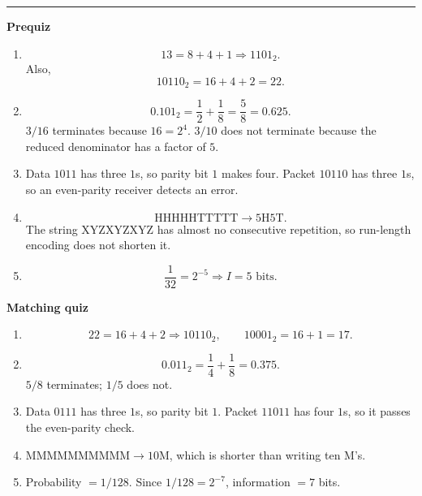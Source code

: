 \documentclass[10pt]{article}
\newcommand{\modulekey}[2]{\clearpage{\Large\bfseries\textcolor{olive}{Module #1: #2 — Answer Key}}\par\textcolor{gold}{\rule{\linewidth}{1.2pt}}\par}
\begin{document}
\modulekey{5}{Basic Computer and Information Theory}
\textbf{Prequiz}
\begin{enumerate}
\item
\[
13=8+4+1\Rightarrow \boxed{1101_2}.
\]
Also,
\[
10110_2=16+4+2=\boxed{22}.
\]
\item
\[
0.101_2=\frac12+\frac18=\frac58=\boxed{0.625}.
\]
\(3/16\) terminates because \(16=2^4\). \(3/10\) does not terminate because the reduced denominator has a factor of \(5\).
\item Data \(1011\) has three \(1\)s, so parity bit \(\boxed1\) makes four. Packet \(10110\) has three \(1\)s, so an even-parity receiver detects an error.
\item
\[
\text{HHHHHTTTTT}\to\boxed{5\text{H}5\text{T}}.
\]
The string XYZXYZXYZ has almost no consecutive repetition, so run-length encoding does not shorten it.
\item
\[
\frac1{32}=2^{-5}\Rightarrow I=\boxed{5\text{ bits}}.
\]
\end{enumerate}

\textbf{Matching quiz}
\begin{enumerate}
\item
\[
22=16+4+2\Rightarrow \boxed{10110_2},\qquad 10001_2=16+1=\boxed{17}.
\]
\item
\[
0.011_2=\frac14+\frac18=\boxed{0.375}.
\]
\(5/8\) terminates; \(1/5\) does not.
\item Data \(0111\) has three \(1\)s, so parity bit \(\boxed1\). Packet \(11011\) has four \(1\)s, so it passes the even-parity check.
\item \(\text{MMMMMMMMMM}\to\boxed{10\text{M}}\), which is shorter than writing ten M's.
\item Probability \(=\boxed{1/128}\). Since \(1/128=2^{-7}\), information \(=\boxed7\) bits.
\end{enumerate}
\end{document}

